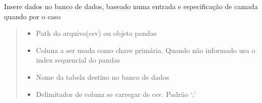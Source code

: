 \documentclass[letterpaper,10pt,brazil]{sphinxmanual}
\begin{document}
\begin{fulllineitems}

\begin{fulllineitems}
\label{\detokenize{api_gen/apiModulo.api_insercao:apiModulo.api_insercao.ApiIns.inserirDados}}
\pysigstartsignatures
{}
\pysigstopsignatures
\sphinxAtStartPar
Insere dados no banco de dados, baseado numa entrada e especificação de camada quando por o caso
\begin{quote}\begin{description}
\begin{itemize}
\item {} 
\sphinxAtStartPar
{} \textendash{} Path do arquivo(csv) ou objeto pandas

\item {} 
\sphinxAtStartPar
{} \textendash{} Coluna a ser usada como chave primária. Quando não informado usa o index sequencial do pandas

\item {} 
\sphinxAtStartPar
{} \textendash{} Nome da tabela destino no banco de dados

\item {} 
\sphinxAtStartPar
{} \textendash{} Delimitador de coluna se carregar de csv. Padrão ‘;’

\end{itemize}

\end{description}\end{quote}

\end{fulllineitems}



\end{fulllineitems}
\end{document}
